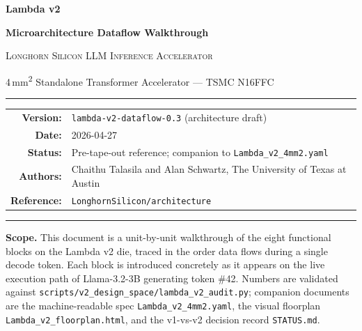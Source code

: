 \documentclass[11pt,letterpaper]{article}
\begin{document}
\thispagestyle{empty}

\begin{center}
\vspace*{2cm}
{\Huge\bfseries Lambda v2 \par}
\vspace{0.3em}
{\Large\bfseries Microarchitecture Dataflow Walkthrough \par}
\vspace{1em}
{\scshape Longhorn Silicon LLM Inference Accelerator \par}
\vspace{0.4em}
{4\,mm\textsuperscript{2} Standalone Transformer Accelerator --- TSMC N16FFC \par}
\vspace{2.5em}

\noindent\rule{0.6\textwidth}{0.4pt}

\vspace{0.8em}
\begin{tabular}{rl}
\textbf{Version:} & \texttt{lambda-v2-dataflow-0.3} (architecture draft) \\
\textbf{Date:} & 2026-04-27 \\
\textbf{Status:} & Pre-tape-out reference; companion to \texttt{Lambda\_v2\_4mm2.yaml} \\
\textbf{Authors:} & Chaithu Talasila and Alan Schwartz, The University of Texas at Austin \\
\textbf{Reference:} & \texttt{LonghornSilicon/architecture} \\
\end{tabular}
\vspace{0.8em}

\noindent\rule{0.6\textwidth}{0.4pt}
\end{center}

\vspace{4em}

\noindent\textbf{Scope.} This document is a unit-by-unit walkthrough of the eight functional
blocks on the Lambda v2 die, traced in the order data flows during a single decode token. Each
block is introduced concretely as it appears on the live execution path of Llama-3.2-3B
generating token \#42. Numbers are validated against
\texttt{scripts/v2\_design\_space/lambda\_v2\_audit.py}; companion documents are the
machine-readable spec \texttt{Lambda\_v2\_4mm2.yaml}, the visual floorplan
\texttt{Lambda\_v2\_floorplan.html}, and the v1-vs-v2 decision record \texttt{STATUS.md}.

\vfill
\end{document}
